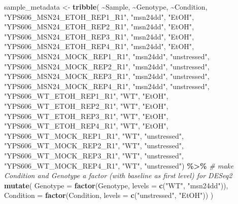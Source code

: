 \documentclass[
]{book}
\newenvironment{Shaded}{\begin{snugshade}}{\end{snugshade}}
\newcommand{\AttributeTok}[1]{\textcolor[rgb]{0.13,0.29,0.53}{#1}}
\newcommand{\CommentTok}[1]{\textcolor[rgb]{0.56,0.35,0.01}{\textit{#1}}}
\newcommand{\FunctionTok}[1]{\textcolor[rgb]{0.13,0.29,0.53}{\textbf{#1}}}
\newcommand{\NormalTok}[1]{#1}
\newcommand{\OtherTok}[1]{\textcolor[rgb]{0.56,0.35,0.01}{#1}}
\newcommand{\SpecialCharTok}[1]{\textcolor[rgb]{0.81,0.36,0.00}{\textbf{#1}}}
\newcommand{\StringTok}[1]{\textcolor[rgb]{0.31,0.60,0.02}{#1}}
\begin{document}
\begin{Shaded}
\begin{Highlighting}[]
\NormalTok{sample\_metadata }\OtherTok{\textless{}{-}} \FunctionTok{tribble}\NormalTok{(}
  \SpecialCharTok{\textasciitilde{}}\NormalTok{Sample,                      }\SpecialCharTok{\textasciitilde{}}\NormalTok{Genotype,    }\SpecialCharTok{\textasciitilde{}}\NormalTok{Condition,}
  \StringTok{"YPS606\_MSN24\_ETOH\_REP1\_R1"}\NormalTok{,   }\StringTok{"msn24dd"}\NormalTok{,   }\StringTok{"EtOH"}\NormalTok{,}
  \StringTok{"YPS606\_MSN24\_ETOH\_REP2\_R1"}\NormalTok{,   }\StringTok{"msn24dd"}\NormalTok{,   }\StringTok{"EtOH"}\NormalTok{,}
  \StringTok{"YPS606\_MSN24\_ETOH\_REP3\_R1"}\NormalTok{,   }\StringTok{"msn24dd"}\NormalTok{,   }\StringTok{"EtOH"}\NormalTok{,}
  \StringTok{"YPS606\_MSN24\_ETOH\_REP4\_R1"}\NormalTok{,   }\StringTok{"msn24dd"}\NormalTok{,   }\StringTok{"EtOH"}\NormalTok{,}
  \StringTok{"YPS606\_MSN24\_MOCK\_REP1\_R1"}\NormalTok{,   }\StringTok{"msn24dd"}\NormalTok{,   }\StringTok{"unstressed"}\NormalTok{,}
  \StringTok{"YPS606\_MSN24\_MOCK\_REP2\_R1"}\NormalTok{,   }\StringTok{"msn24dd"}\NormalTok{,   }\StringTok{"unstressed"}\NormalTok{,}
  \StringTok{"YPS606\_MSN24\_MOCK\_REP3\_R1"}\NormalTok{,   }\StringTok{"msn24dd"}\NormalTok{,   }\StringTok{"unstressed"}\NormalTok{,}
  \StringTok{"YPS606\_MSN24\_MOCK\_REP4\_R1"}\NormalTok{,   }\StringTok{"msn24dd"}\NormalTok{,   }\StringTok{"unstressed"}\NormalTok{,}
  \StringTok{"YPS606\_WT\_ETOH\_REP1\_R1"}\NormalTok{,      }\StringTok{"WT"}\NormalTok{,        }\StringTok{"EtOH"}\NormalTok{,}
  \StringTok{"YPS606\_WT\_ETOH\_REP2\_R1"}\NormalTok{,      }\StringTok{"WT"}\NormalTok{,        }\StringTok{"EtOH"}\NormalTok{,}
  \StringTok{"YPS606\_WT\_ETOH\_REP3\_R1"}\NormalTok{,      }\StringTok{"WT"}\NormalTok{,        }\StringTok{"EtOH"}\NormalTok{,}
  \StringTok{"YPS606\_WT\_ETOH\_REP4\_R1"}\NormalTok{,      }\StringTok{"WT"}\NormalTok{,        }\StringTok{"EtOH"}\NormalTok{,}
  \StringTok{"YPS606\_WT\_MOCK\_REP1\_R1"}\NormalTok{,      }\StringTok{"WT"}\NormalTok{,        }\StringTok{"unstressed"}\NormalTok{,}
  \StringTok{"YPS606\_WT\_MOCK\_REP2\_R1"}\NormalTok{,      }\StringTok{"WT"}\NormalTok{,        }\StringTok{"unstressed"}\NormalTok{,}
  \StringTok{"YPS606\_WT\_MOCK\_REP3\_R1"}\NormalTok{,      }\StringTok{"WT"}\NormalTok{,        }\StringTok{"unstressed"}\NormalTok{,}
  \StringTok{"YPS606\_WT\_MOCK\_REP4\_R1"}\NormalTok{,      }\StringTok{"WT"}\NormalTok{,        }\StringTok{"unstressed"}\NormalTok{) }\SpecialCharTok{\%\textgreater{}\%}
  \CommentTok{\# make Condition and Genotype a factor (with baseline as first level) for DESeq2}
  \FunctionTok{mutate}\NormalTok{(}
    \AttributeTok{Genotype =} \FunctionTok{factor}\NormalTok{(Genotype,}
                      \AttributeTok{levels =} \FunctionTok{c}\NormalTok{(}\StringTok{"WT"}\NormalTok{, }\StringTok{"msn24dd"}\NormalTok{)),}
    \AttributeTok{Condition =} \FunctionTok{factor}\NormalTok{(Condition,}
                       \AttributeTok{levels =} \FunctionTok{c}\NormalTok{(}\StringTok{"unstressed"}\NormalTok{, }\StringTok{"EtOH"}\NormalTok{))}
\NormalTok{  )}
\end{Highlighting}
\end{Shaded}
\end{document}
